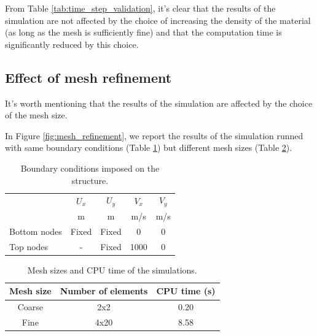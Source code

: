 From Table \ref{tab:time_step_validation}, it's clear that the results of the simulation are not affected by the choice of increasing the density of the material (as long as the mesh is sufficiently fine) and that the computation time is significantly reduced by this choice.


\subsection{Effect of mesh refinement}

It's worth mentioning that the results of the simulation are affected by the choice of the mesh size.

In Figure \ref{fig:mesh_refinement}, we report the results of the simulation runned with same boundary conditions (Table \ref{tab:boundary_conditions_for_mesh_refinement}) but different mesh sizes (Table \ref{tab:mesh_sizes}).

\begin{table}[H]
    \centering
    \begin{tabular}{|l|c|c|c|c|}
        \hline
        ~            & $U_x$ & $U_y$ & $V_x$ & $V_y$ \\
        ~            & m     & m     & m/s   & m/s   \\
        \hline
        Bottom nodes & Fixed & Fixed & 0     & 0     \\
        Top nodes    & -     & Fixed & 1000  & 0     \\
        \hline
    \end{tabular}
    \caption{Boundary conditions imposed on the structure.}
    \label{tab:boundary_conditions_for_mesh_refinement}
\end{table}

\begin{table}[H]
    \centering
    \begin{tabular}{|c|c|c|}
        \hline
        \textbf{Mesh size} & \textbf{Number of elements} & \textbf{CPU time (s)} \\
        \hline
        Coarse             & 2x2                         & 0.20                  \\
        Fine               & 4x20                        & 8.58                  \\
        \hline
    \end{tabular}
    \caption{Mesh sizes and CPU time of the simulations.}
    \label{tab:mesh_sizes}
\end{table}

